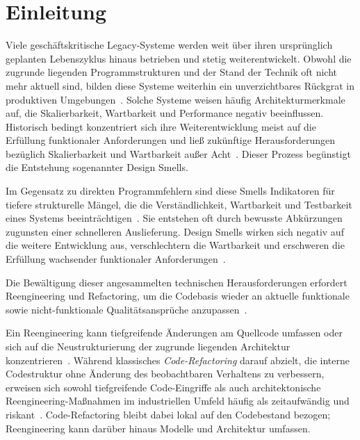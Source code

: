 \chapter{Einleitung}
\label{ch:einleitung}

Viele geschäftskritische Legacy-Systeme werden weit über ihren ursprünglich geplanten Lebenszyklus hinaus betrieben und stetig weiterentwickelt. %
Obwohl die zugrunde liegenden Programmstrukturen und der Stand der Technik oft nicht mehr aktuell sind, bilden diese Systeme weiterhin ein unverzichtbares Rückgrat in produktiven Umgebungen~\citep{363157}. Solche Systeme weisen häufig Architekturmerkmale auf, die Skalierbarkeit, Wartbarkeit und Performance negativ beeinflussen. %
Historisch bedingt konzentriert sich ihre Weiterentwicklung meist auf die Erfüllung funktionaler Anforderungen und ließ zukünftige Herausforderungen bezüglich Skalierbarkeit und Wartbarkeit außer Acht~\citep{refactoring_for_software_architecture_smells}. Dieser Prozess begünstigt die Entstehung sogenannter Design Smells.

Im Gegensatz zu direkten Programmfehlern sind diese Smells Indikatoren für tiefere strukturelle Mängel, die die Verständlichkeit, Wartbarkeit und Testbarkeit eines Systems beeinträchtigen~\citep{software_design_smell_detection}. Sie entstehen oft durch bewusste Abkürzungen zugunsten einer schnelleren Auslieferung. Design Smells wirken sich negativ auf die weitere Entwicklung aus, verschlechtern die Wartbarkeit und erschweren die Erfüllung wachsender funktionaler Anforderungen~\citep{sharma2020}.

Die Bewältigung dieser angesammelten technischen Herausforderungen erfordert Reengineering und Refactoring, um die Codebasis wieder an aktuelle funktionale sowie nicht-funktionale Qualitätsansprüche anzupassen~\citep{laguna_systematic_2013, majthoub_software_2018}.

Ein Reengineering kann tiefgreifende Änderungen am Quellcode umfassen oder sich auf die Neustrukturierung der zugrunde liegenden Architektur konzentrieren~\citep{laguna_systematic_2013}. %
Während klassisches \textit{Code-Refactoring} darauf abzielt, die interne Codestruktur ohne Änderung des beobachtbaren Verhaltens zu verbessern, erweisen sich sowohl tiefgreifende Code-Eingriffe als auch architektonische Reengineering-Maßnahmen im industriellen Umfeld häufig als zeitaufwändig und riskant~\citep{stevens_systems_1998, matthiesen_why_2015}. Code-Refactoring bleibt dabei lokal auf den Codebestand bezogen; Reengineering kann darüber hinaus Modelle und Architektur umfassen.


